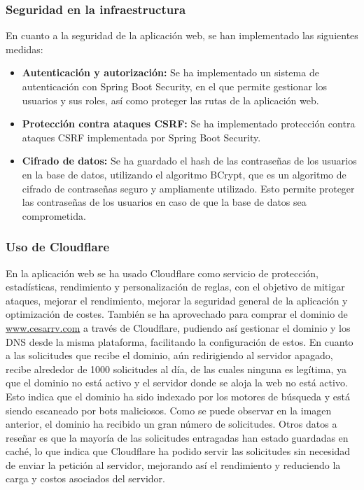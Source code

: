 \subsubsection{Seguridad en la infraestructura}

En cuanto a la seguridad de la aplicación web, se han implementado las siguientes medidas:
\begin{itemize}
    \item \textbf{Autenticación y autorización:} Se ha implementado un sistema de autenticación con Spring Boot Security, en el que permite gestionar los usuarios y sus roles, así como proteger las rutas de la aplicación web.
    \item \textbf{Protección contra ataques CSRF:} Se ha implementado protección contra ataques CSRF implementada por Spring Boot Security.
    \item \textbf{Cifrado de datos:} Se ha guardado el hash de las contraseñas de los usuarios en la base de datos, utilizando el algoritmo BCrypt, que es un algoritmo de cifrado de contraseñas seguro y ampliamente utilizado. Esto permite proteger las contraseñas de los usuarios en caso de que la base de datos sea comprometida.
\end{itemize}


\subsubsection{Uso de Cloudflare}
En la aplicación web se ha usado Cloudflare como servicio de protección, estadísticas, rendimiento y personalización de reglas, con el objetivo de mitigar ataques, mejorar el rendimiento, mejorar la seguridad general de la aplicación y optimización de costes.
También se ha aprovechado para comprar el dominio de \url{www.cesarrv.com} a través de Cloudflare, pudiendo así gestionar el dominio y los DNS desde la misma plataforma, facilitando la configuración de estos.
En cuanto a las solicitudes que recibe el dominio, aún redirigiendo al servidor apagado, recibe alrededor de 1000 solicitudes al día, de las cuales ninguna es legítima, ya que el dominio no está activo y el servidor donde se aloja la web no está activo. Esto indica que el dominio ha sido indexado por los motores de búsqueda y está siendo escaneado por bots maliciosos.
Como se puede observar en la imagen anterior, el dominio ha recibido un gran número de solicitudes. Otros datos a reseñar es que la mayoría de las solicitudes entragadas han estado guardadas en caché, lo que indica que Cloudflare ha podido servir las solicitudes sin necesidad de enviar la petición al servidor, mejorando así el rendimiento y reduciendo la carga y costos asociados del servidor.

